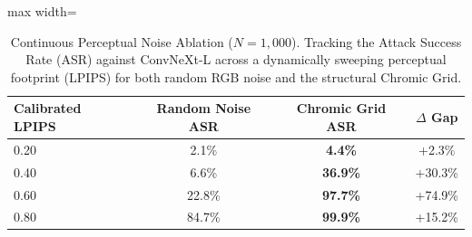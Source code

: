 \begin{table}[ht]
\centering
\small
\caption{Continuous Perceptual Noise Ablation ($N=1{,}000$). Tracking the Attack Success Rate (ASR) against ConvNeXt-L across a dynamically sweeping perceptual footprint (LPIPS) for both random RGB noise and the structural Chromic Grid.}
\label{tab:random_noise_baserate}
\begin{adjustbox}{max width=\linewidth}
\begin{tabular}{@{}lccc@{}}
\toprule
\textbf{Calibrated LPIPS} & \textbf{Random Noise ASR} & \textbf{Chromic Grid ASR} & \textbf{$\Delta$ Gap} \\ \midrule
0.20 & 2.1\% & \textbf{4.4\%} & +2.3\% \\
0.40 & 6.6\% & \textbf{36.9\%} & +30.3\% \\
0.60 & 22.8\% & \textbf{97.7\%} & +74.9\% \\
0.80 & 84.7\% & \textbf{99.9\%} & +15.2\% \\
\bottomrule
\end{tabular}
\end{adjustbox}
\end{table}
